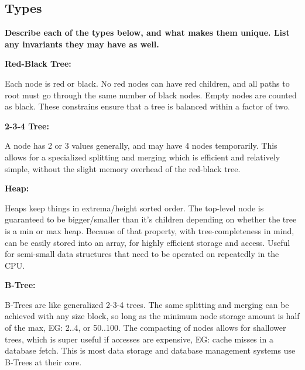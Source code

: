 \documentclass[12pt, letterpaper]{article}
\newcommand{\question}[1]{\textbf{#1}\par}
\newenvironment{answerblock}{\color{Green4}}{\normalcolor\vspace{1em}}
\begin{document}
\subsection{Types}

\textbf{Describe each of the types below, and what makes them unique. List any
invariants they may have as well.}

\question{Red-Black Tree:}

\begin{answerblock}
Each node is red or black. No red nodes can have red children, and all paths to
root must go through the same number of black nodes. Empty nodes are counted as
black. These constrains ensure that a tree is balanced within a factor of two.
\end{answerblock}

\question{2-3-4 Tree:}

\begin{answerblock}
A node has 2 or 3 values generally, and may have 4 nodes temporarily. This
allows for a specialized splitting and merging which is efficient and
relatively simple, without the slight memory overhead of the red-black tree.
\end{answerblock}

\begin{minipage}{\textwidth}
\question{Heap:}

\begin{answerblock}
Heaps keep things in extrema/height sorted order. The top-level node is
guaranteed to be bigger/smaller than it's children depending on whether the
tree is a min or max heap. Because of that property, with tree-completeness in
mind, can be easily stored into an array, for highly efficient storage and
access. Useful for semi-small data structures that need to be operated on
repeatedly in the CPU.
\end{answerblock}
\end{minipage}

\question{B-Tree:}

\begin{answerblock}
B-Trees are like generalized 2-3-4 trees. The same splitting and merging can be
achieved with any size block, so long as the minimum node storage amount is
half of the max, EG: 2..4, or 50..100. The compacting of nodes allows for
shallower trees, which is super useful if accesses are expensive, EG: cache
misses in a database fetch. This is most data storage and database management
systems use B-Trees at their core.
\end{answerblock}
\end{document}
